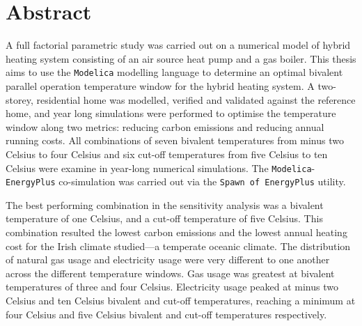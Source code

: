 

\begingroup
\let\clearpage\relax
\let\cleardoublepage\relax
\let\cleardoublepage\relax

\chapter*{Abstract}

A full factorial parametric study was carried out on a numerical model of hybrid heating system consisting of an air source heat pump and a gas boiler. This thesis aims to use the \texttt{Modelica} modelling language to determine an optimal bivalent parallel operation temperature window for the hybrid heating system. A two-storey, residential home was modelled, verified and validated against the reference home, and year long simulations were performed to optimise the temperature window along two metrics: reducing carbon emissions and reducing annual running costs. All combinations of seven bivalent temperatures from minus two Celsius to four Celsius and six cut-off temperatures from five Celsius to ten Celsius were examine in year-long numerical simulations. The \texttt{Modelica}-\texttt{EnergyPlus} co-simulation was carried out via the \texttt{Spawn of EnergyPlus} utility.

The best performing combination in the sensitivity analysis was a bivalent temperature of one Celsius, and  a cut-off temperature of five Celsius. This combination resulted the lowest carbon emissions and the lowest annual heating cost for the Irish climate studied---a temperate oceanic climate. The distribution of natural gas usage and electricity usage were very different to one another across the different temperature windows. Gas usage was greatest at bivalent temperatures of three and four Celsius. Electricity usage peaked at minus two Celsius and ten Celsius bivalent and cut-off temperatures, reaching a minimum at four Celsius and five Celsius bivalent and cut-off temperatures respectively. 

